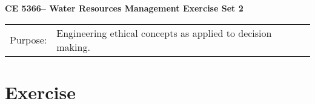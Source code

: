 \documentclass[12pt]{article}
\begin{document}
\begin{center}
{\textbf{{ CE 5366-- Water Resources Management}  {Exercise Set 2}}}
\end{center}
\begingroup
\begin{tabular}{p{1in} p{5in}}
Purpose: & Engineering ethical concepts as applied to decision making.\\
\end{tabular}
\endgroup
\section*{\small{Exercise}}
\begin{enumerate}

\end{enumerate}
\end{document}
